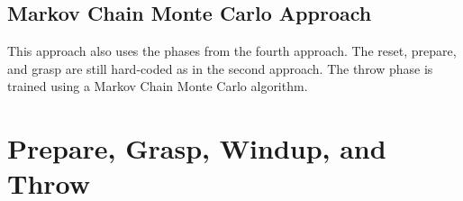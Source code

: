 \subsection{Markov Chain Monte Carlo Approach} \label{subsec:MCMC}

This approach also uses the phases from the fourth approach. The reset, prepare, and grasp are still hard-coded as in the second approach. The throw phase is trained using a Markov Chain Monte Carlo algorithm. 


\section{Prepare, Grasp, Windup, and Throw} \label{sec:Windup}